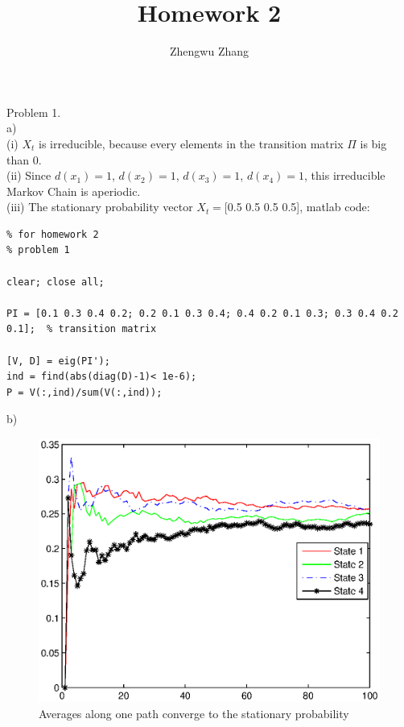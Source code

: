 \documentclass[12pt] {article}
\author{Zhengwu Zhang}
\title{Homework 2}
\begin{document}
 
\maketitle
 
\newpage
Problem 1. \\
a) \\
 (i) $X_t$ is irreducible, because every elements in the transition matrix $\Pi$ is big than 0. \\
 (ii) Since $d(x_1)=1$, $d(x_2)=1$, $d(x_3)=1$, $d(x_4)=1$, this irreducible Markov Chain is aperiodic. \\
 (iii) The stationary probability vector $X_t=$[0.5 0.5 0.5 0.5], matlab code:
  \begin{lstlisting}
% for homework 2
% problem 1

clear; close all;

PI = [0.1 0.3 0.4 0.2; 0.2 0.1 0.3 0.4; 0.4 0.2 0.1 0.3; 0.3 0.4 0.2 0.1];  % transition matrix

[V, D] = eig(PI'); 
ind = find(abs(diag(D)-1)< 1e-6);
P = V(:,ind)/sum(V(:,ind));
  \end{lstlisting}

b)\\
\begin{figure}
\begin{center}

\includegraphics[height=2.2 in] {hm2_prob1_b.eps}
\caption{Averages along one path converge to the stationary probability}

\end{center}
\end{figure}
\end{document}
